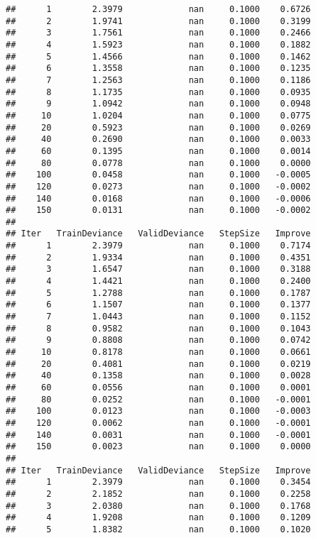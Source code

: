 \documentclass[]{article}
\begin{document}
\begin{verbatim}
##      1        2.3979             nan     0.1000    0.6726
##      2        1.9741             nan     0.1000    0.3199
##      3        1.7561             nan     0.1000    0.2466
##      4        1.5923             nan     0.1000    0.1882
##      5        1.4566             nan     0.1000    0.1462
##      6        1.3558             nan     0.1000    0.1235
##      7        1.2563             nan     0.1000    0.1186
##      8        1.1735             nan     0.1000    0.0935
##      9        1.0942             nan     0.1000    0.0948
##     10        1.0204             nan     0.1000    0.0775
##     20        0.5923             nan     0.1000    0.0269
##     40        0.2690             nan     0.1000    0.0033
##     60        0.1395             nan     0.1000    0.0014
##     80        0.0778             nan     0.1000    0.0000
##    100        0.0458             nan     0.1000   -0.0005
##    120        0.0273             nan     0.1000   -0.0002
##    140        0.0168             nan     0.1000   -0.0006
##    150        0.0131             nan     0.1000   -0.0002
## 
## Iter   TrainDeviance   ValidDeviance   StepSize   Improve
##      1        2.3979             nan     0.1000    0.7174
##      2        1.9334             nan     0.1000    0.4351
##      3        1.6547             nan     0.1000    0.3188
##      4        1.4421             nan     0.1000    0.2400
##      5        1.2788             nan     0.1000    0.1787
##      6        1.1507             nan     0.1000    0.1377
##      7        1.0443             nan     0.1000    0.1152
##      8        0.9582             nan     0.1000    0.1043
##      9        0.8808             nan     0.1000    0.0742
##     10        0.8178             nan     0.1000    0.0661
##     20        0.4081             nan     0.1000    0.0219
##     40        0.1358             nan     0.1000    0.0028
##     60        0.0556             nan     0.1000    0.0001
##     80        0.0252             nan     0.1000   -0.0001
##    100        0.0123             nan     0.1000   -0.0003
##    120        0.0062             nan     0.1000   -0.0001
##    140        0.0031             nan     0.1000   -0.0001
##    150        0.0023             nan     0.1000    0.0000
## 
## Iter   TrainDeviance   ValidDeviance   StepSize   Improve
##      1        2.3979             nan     0.1000    0.3454
##      2        2.1852             nan     0.1000    0.2258
##      3        2.0380             nan     0.1000    0.1768
##      4        1.9208             nan     0.1000    0.1209
##      5        1.8382             nan     0.1000    0.1020

\end{verbatim}
\end{document}
